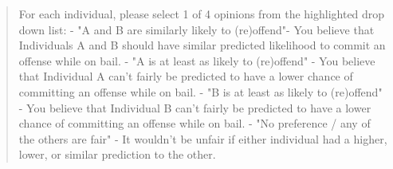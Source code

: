 \begin{quote}
        For each individual, please select 1 of 4 opinions from the highlighted drop down list:
        - "A and B are similarly likely to (re)offend"- You believe that Individuals A and B should have similar predicted likelihood to commit an offense while on bail.
        - "A is at least as likely to (re)offend" - You believe that Individual A can't fairly be predicted to have a lower chance of committing an offense while on bail.
        - "B is at least as likely to (re)offend" - You believe that Individual B can't fairly be predicted to have a lower chance of committing an offense while on bail.
        - "No preference / any of the others are fair" - It wouldn't be unfair if either individual had a higher, lower, or similar prediction to the other.
    \end{quote}
